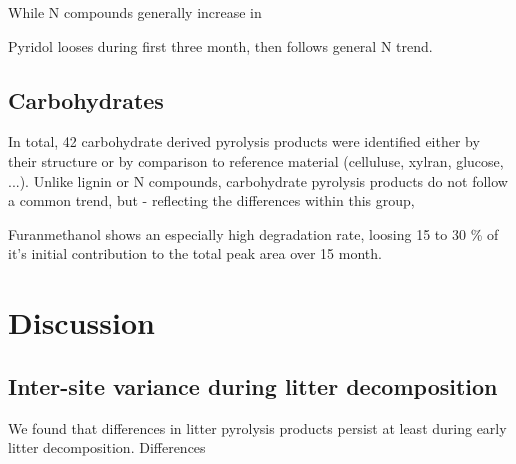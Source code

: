 \documentclass[preprint,review,12pt]{elsarticle}
\begin{document}
While N compounds generally increase in 

Pyridol looses during first three month, then follows general N trend.

\subsection{Carbohydrates}
In total, 42 carbohydrate derived pyrolysis products were identified either by their structure or by comparison to reference material (celluluse, xylran, glucose, ...). Unlike lignin or N compounds, carbohydrate pyrolysis products do not follow a common trend, but - reflecting the differences within this group, 



Furanmethanol shows an especially high degradation rate, loosing 15 to 30 \% of it's initial contribution to the total peak area over 15 month.


\section{Discussion}

\subsection{Inter-site variance during litter decomposition}
We found that differences in litter pyrolysis products persist at least during early litter decomposition. Differences 
\end{document}
